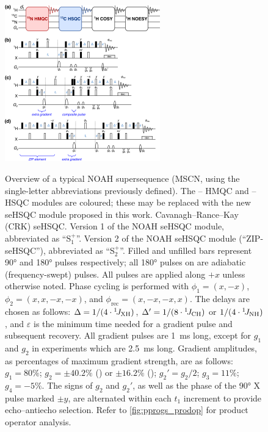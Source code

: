 \documentclass[11pt]{article}
\newcommand*{\noahSpa}{S$^+_1$}
\newcommand*{\noahSpb}{S$^+_2$}
\newcommand*{\carbon}{\ce{^{13}C}}
\newcommand*{\proton}{\ce{^{1}H}}
\newcommand*{\nitrogen}{\ce{^{15}N}}
\newcommand*{\onejxh}{{}^{1}\!J_{\ce{XH}}}
\newcommand*{\onejch}{{}^{1}\!J_{\ce{CH}}}
\newcommand*{\onejnh}{{}^{1}\!J_{\ce{NH}}}
\begin{document}
\begin{refsection}
\begin{figure}
    \centering
    \includegraphics[width=0.6\textwidth]{pprogs.png}
    {\label{fig:pprogs_overview}}
    {\label{fig:pprogs_crk}}
    {\label{fig:pprogs_spv1}}
    {\label{fig:pprogs_spv2}}
    \caption{
        \textbf{} Overview of a typical NOAH supersequence (MSCN, using the single-letter abbreviations previously defined\autocite{Kupce2017ACIE}).
        The \proton{}--\nitrogen{} HMQC and \proton{}--\carbon{} HSQC modules are coloured; these may be replaced with the new seHSQC module proposed in this work.
        \textbf{} Cavanagh--Rance--Kay (CRK) seHSQC.\autocite{sehsqc}
        \textbf{} Version 1 of the NOAH seHSQC module, abbreviated as ``\noahSpa{}''.
        \textbf{} Version 2 of the NOAH seHSQC module (``ZIP-seHSQC''), abbreviated as ``\noahSpb{}''.
        Filled and unfilled bars represent \ang{90} and \ang{180} pulses respectively; all \ang{180} pulses on \carbon{} are adiabatic (frequency-swept) pulses.
        All pulses are applied along $+x$ unless otherwise noted.
        Phase cycling is performed with $\phi_1 = (x, -x)$, $\phi_2 = (x, x, -x, -x)$, and $\phi_{\mathrm{rec}} = (x, -x, -x, x)$.
        The delays are chosen as follows: $\Delta = 1/(4\cdot\onejxh)$, $\Delta' = 1/(8\cdot\onejch)$ or $1/(4\cdot\onejnh)$, and $\varepsilon$ is the minimum time needed for a gradient pulse and subsequent recovery.
        All gradient pulses are \SI{1}{\ms} long, except for $g_1$ and $g_2$ in \nitrogen{} experiments which are \SI{2.5}{\ms} long.
        Gradient amplitudes, as percentages of maximum gradient strength, are as follows: $g_1 = 80\%$; $g_2 = \pm 40.2\%$ (\carbon{}) or $\pm 16.2\%$ (\nitrogen{}); ${g_2}' = g_2/2$; $g_3 = 11\%$; $g_4 = -5\%$.
        The signs of $g_2$ and ${g_2}'$, as well as the phase of the \ang{90} X pulse marked $\pm y$, are alternated within each $t_1$ increment to provide echo--antiecho selection.
        Refer to \cref{fig:pprogs_prodop} for product operator analysis.
    }
    \label{fig:pprogs}
\end{figure}


\end{refsection}
\end{document}
